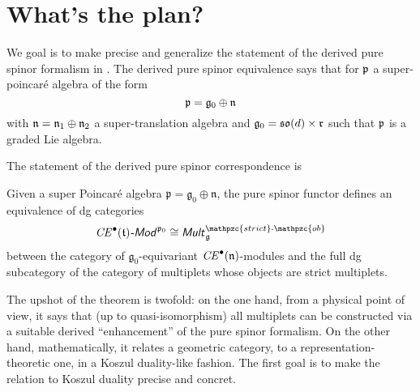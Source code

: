 \section{What's the plan?}

We goal is to make precise and generalize the statement of the derived pure
spinor formalism in \cite{EHS22}. The derived pure spinor equivalence says that
for $\mathfrak{p}$ a super-poincar\'e algebra of the form 
\begin{equation}
    \mathfrak{p} = \mathfrak{g}_0 \oplus \mathfrak{n}
\end{equation}
with $\mathfrak{n} = \mathfrak{n}_1 \oplus \mathfrak{n}_2$ a super-translation algebra and $\mathfrak{g}_0 = \mathfrak{so} (d)
\times \mathfrak{r}$ such that $\mathfrak{p}$ is a graded Lie algebra.

The statement of the derived pure spinor correspondence is 
\begin{comment}
Accordingly, instead of considering only $R/I$-modules one considers
$\mbox{CE}^\bullet (\mathfrak{t})$-modules as input: geometrically, this amount
to consider modules on the derived scheme $\mbox{Spec} (\mbox{CE}^\bullet
(\mathfrak{t}))$ instead of modules on the nilpotence variety $Y = \mbox{Spec}
(R/I).$ In particular, the following holds.
\end{comment}

\begin{theorem} \label{derivedPS} Given a super
Poincar\'e algebra $\mathfrak{p} = \mathfrak{g}_0 \oplus \mathfrak{n}$, the pure spinor functor defines an equivalence of dg categories 
\begin{equation}
\mbox{\emph{CE}}^\bullet (\mathfrak{t})\mbox{\emph{-\sffamily{Mod}}}^{\mathfrak{p}_0} \cong \mbox{\emph{\sffamily{Mult}}}^{\mathpzc{strict}\mbox{\tiny{-}}\mathpzc{ob}}_{\mathfrak{g}}
\end{equation}
between the category of $\mathfrak{g}_0$-equivariant $\mbox{\emph{CE}}^\bullet
(\mathfrak{n})$-modules and the full dg subcategory of the category of multiplets whose objects are strict multiplets.
\end{theorem}
\noindent The upshot of the theorem is twofold: on the one hand, from a physical
point of view, it says that (up to quasi-isomorphism) all multiplets can be
constructed via a suitable derived ``enhancement'' of the pure spinor formalism.
On the other hand, mathematically, it relates a geometric category, to a
representation-theoretic one, in a Koszul duality-like fashion. 
The first goal is to make the relation to Koszul duality precise and concret.

